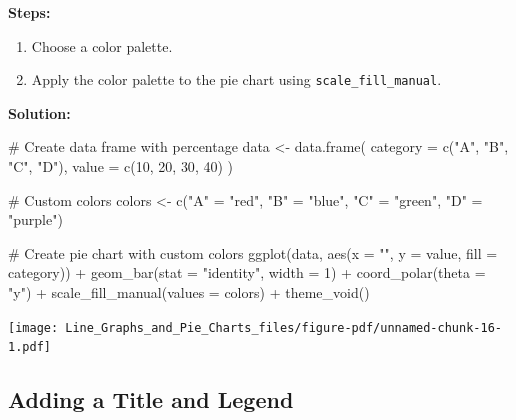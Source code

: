\documentclass[
  letterpaper,
  DIV=11,
  numbers=noendperiod]{scrreprt}
\newenvironment{Shaded}{\begin{snugshade}}{\end{snugshade}}
\newcommand{\AttributeTok}[1]{\textcolor[rgb]{0.40,0.45,0.13}{#1}}
\newcommand{\CommentTok}[1]{\textcolor[rgb]{0.37,0.37,0.37}{#1}}
\newcommand{\DecValTok}[1]{\textcolor[rgb]{0.68,0.00,0.00}{#1}}
\newcommand{\FunctionTok}[1]{\textcolor[rgb]{0.28,0.35,0.67}{#1}}
\newcommand{\NormalTok}[1]{\textcolor[rgb]{0.00,0.23,0.31}{#1}}
\newcommand{\OtherTok}[1]{\textcolor[rgb]{0.00,0.23,0.31}{#1}}
\newcommand{\SpecialCharTok}[1]{\textcolor[rgb]{0.37,0.37,0.37}{#1}}
\newcommand{\StringTok}[1]{\textcolor[rgb]{0.13,0.47,0.30}{#1}}
\providecommand{\tightlist}{%
  \setlength{\itemsep}{0pt}\setlength{\parskip}{0pt}}\usepackage{longtable,booktabs,array}
\begin{document}
\textbf{Steps:}

\begin{enumerate}
\def\labelenumi{\arabic{enumi}.}
\tightlist
\item
  Choose a color palette.
\item
  Apply the color palette to the pie chart using
  \texttt{scale\_fill\_manual}.
\end{enumerate}

\textbf{Solution:}

\begin{Shaded}
\begin{Highlighting}[]
\CommentTok{\# Create data frame with percentage}
\NormalTok{data }\OtherTok{\textless{}{-}} \FunctionTok{data.frame}\NormalTok{(}
  \AttributeTok{category =} \FunctionTok{c}\NormalTok{(}\StringTok{"A"}\NormalTok{, }\StringTok{"B"}\NormalTok{, }\StringTok{"C"}\NormalTok{, }\StringTok{"D"}\NormalTok{),}
  \AttributeTok{value =} \FunctionTok{c}\NormalTok{(}\DecValTok{10}\NormalTok{, }\DecValTok{20}\NormalTok{, }\DecValTok{30}\NormalTok{, }\DecValTok{40}\NormalTok{)}
\NormalTok{)}

\CommentTok{\# Custom colors}
\NormalTok{colors }\OtherTok{\textless{}{-}} \FunctionTok{c}\NormalTok{(}\StringTok{"A"} \OtherTok{=} \StringTok{"red"}\NormalTok{, }\StringTok{"B"} \OtherTok{=} \StringTok{"blue"}\NormalTok{, }\StringTok{"C"} \OtherTok{=} \StringTok{"green"}\NormalTok{, }\StringTok{"D"} \OtherTok{=} \StringTok{"purple"}\NormalTok{)}

\CommentTok{\# Create pie chart with custom colors}
\FunctionTok{ggplot}\NormalTok{(data, }\FunctionTok{aes}\NormalTok{(}\AttributeTok{x =} \StringTok{""}\NormalTok{, }\AttributeTok{y =}\NormalTok{ value, }\AttributeTok{fill =}\NormalTok{ category)) }\SpecialCharTok{+}
  \FunctionTok{geom\_bar}\NormalTok{(}\AttributeTok{stat =} \StringTok{"identity"}\NormalTok{, }\AttributeTok{width =} \DecValTok{1}\NormalTok{) }\SpecialCharTok{+}
  \FunctionTok{coord\_polar}\NormalTok{(}\AttributeTok{theta =} \StringTok{"y"}\NormalTok{) }\SpecialCharTok{+}
  \FunctionTok{scale\_fill\_manual}\NormalTok{(}\AttributeTok{values =}\NormalTok{ colors) }\SpecialCharTok{+}
  \FunctionTok{theme\_void}\NormalTok{()}
\end{Highlighting}
\end{Shaded}

\texttt{[image: Line\_Graphs\_and\_Pie\_Charts\_files/figure-pdf/unnamed-chunk-16-1.pdf]}

\subsection*{Adding a Title and Legend}\label{adding-a-title-and-legend}
\end{document}
